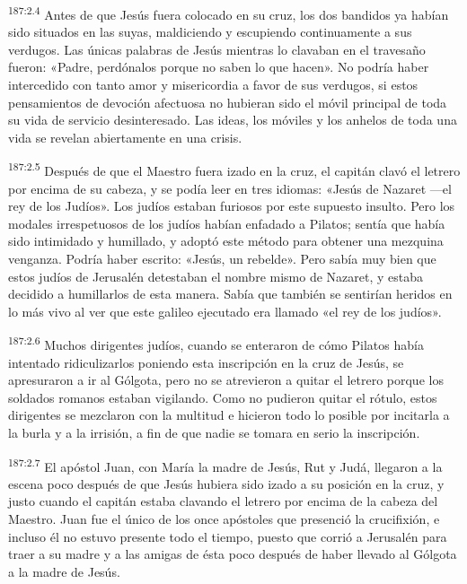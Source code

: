 \par 
\textsuperscript{187:2.4} Antes de que Jesús fuera colocado en su cruz, los dos bandidos ya habían sido situados en las suyas, maldiciendo y escupiendo continuamente a sus verdugos. Las únicas palabras de Jesús mientras lo clavaban en el travesaño fueron: «Padre, perdónalos porque no saben lo que hacen». No podría haber intercedido con tanto amor y misericordia a favor de sus verdugos, si estos pensamientos de devoción afectuosa no hubieran sido el móvil principal de toda su vida de servicio desinteresado. Las ideas, los móviles y los anhelos de toda una vida se revelan abiertamente en una crisis.

\par 
\textsuperscript{187:2.5} Después de que el Maestro fuera izado en la cruz, el capitán clavó el letrero por encima de su cabeza, y se podía leer en tres idiomas: «Jesús de Nazaret ---el rey de los Judíos». Los judíos estaban furiosos por este supuesto insulto. Pero los modales irrespetuosos de los judíos habían enfadado a Pilatos; sentía que había sido intimidado y humillado, y adoptó este método para obtener una mezquina venganza. Podría haber escrito: «Jesús, un rebelde». Pero sabía muy bien que estos judíos de Jerusalén detestaban el nombre mismo de Nazaret, y estaba decidido a humillarlos de esta manera. Sabía que también se sentirían heridos en lo más vivo al ver que este galileo ejecutado era llamado «el rey de los judíos».

\par 
\textsuperscript{187:2.6} Muchos dirigentes judíos, cuando se enteraron de cómo Pilatos había intentado ridiculizarlos poniendo esta inscripción en la cruz de Jesús, se apresuraron a ir al Gólgota, pero no se atrevieron a quitar el letrero porque los soldados romanos estaban vigilando. Como no pudieron quitar el rótulo, estos dirigentes se mezclaron con la multitud e hicieron todo lo posible por incitarla a la burla y a la irrisión, a fin de que nadie se tomara en serio la inscripción.

\par 
\textsuperscript{187:2.7} El apóstol Juan, con María la madre de Jesús, Rut y Judá, llegaron a la escena poco después de que Jesús hubiera sido izado a su posición en la cruz, y justo cuando el capitán estaba clavando el letrero por encima de la cabeza del Maestro. Juan fue el único de los once apóstoles que presenció la crucifixión, e incluso él no estuvo presente todo el tiempo, puesto que corrió a Jerusalén para traer a su madre y a las amigas de ésta poco después de haber llevado al Gólgota a la madre de Jesús.

